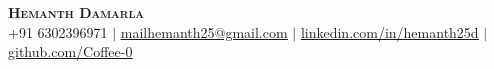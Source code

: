 \begin{center}
	\textbf{\Huge \scshape Hemanth Damarla} \\ \vspace{7pt}
	\small +91 6302396971 $|$
    \href{mailhemanth25@gmail.com}{\underline{mailhemanth25@gmail.com}} $|$
	\href{https://www.linkedin.com/in/hemanth25d/}{\underline{linkedin.com/in/hemanth25d}} $|$
	\href{https://github.com/Coffee-0}{\underline{github.com/Coffee-0}}
\end{center}